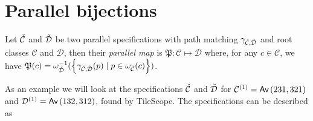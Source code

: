 \section{Parallel bijections}
\begin{definition}
Let $\check{\mathcal{C}}$ and $\check{\mathcal{D}}$ be two parallel specifications with path matching $\gamma_{\check{\mathcal{C}},\check{\mathcal{D}}}$ and root classes $\mathcal{C}$ and $\mathcal{D}$, then their \emph{parallel map} is
$\mathfrak{P}: \mathcal{C} \mapsto \mathcal{D}$ where, for any $c \in \mathcal{C}$, we have
$\mathfrak{P}(c) = \omega_{\check{\mathcal{D}}}^{-1}(\left\{\gamma_{\check{\mathcal{C}},\check{\mathcal{D}}}(p) \mid p \in \omega_{\check{\mathcal{C}}}(c)\right\})$.
\end{definition}

As an example we will look at the specifications $\check{\mathcal{C}}$ and $\check{\mathcal{D}}$ for $\mathcal{C}^{(1)} = \textsf{Av}\left(231,321\right)$ and $\mathcal{D}^{(1)} = \textsf{Av}\left(132,312\right)$, found by TileScope. The specifications can be described as
